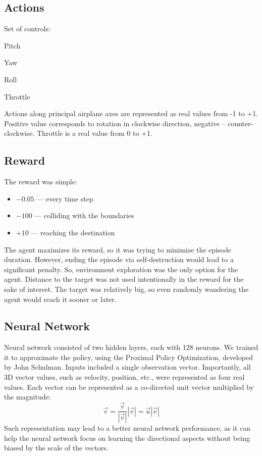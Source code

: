 \subsection{Actions}\label{subsec:pathfinder_actions}
Set of controls:
\begin{itemize}
	\begin{multicols}{2}
		\item Pitch
		\item Yaw
		\item Roll
		\item Throttle
	\end{multicols}
\end{itemize}
Actions along principal airplane axes are represented as real values from -1 to +1.
Positive value corresponds to rotation in clockwise direction, negative -- counter-clockwise.
Throttle is a real value from 0 to +1.

\subsection{Reward}\label{subsec:pathfinder_reward}
The reward was simple:
\begin{itemize}
	\item $-0.05$ — every time step
	\item $-100$ — colliding with the boundaries
	\item $+10$ — reaching the destination
\end{itemize}
The agent maximizes its reward, so it was trying to minimize the episode duration.
However, ending the episode via self-destruction would lead to a significant penalty.
So, environment exploration was the only option for the agent.
Distance to the target was not used intentionally in the reward for the sake of interest.
The target was relatively big, so even randomly wandering the agent would reach it sooner or later.

\subsection{Neural Network}\label{subsec:pathfinder_neural-network}
Neural network consisted of two hidden layers, each with 128 neurons.
We trained it to approximate the policy, using the Proximal Policy Optimization, developed by John Schulman.
Inputs included a single observation vector.
Importantly, all 3D vector values, such as velocity, position, etc., were represented as four real values.
Each vector can be represented as a co-directed unit vector multiplied by the magnitude:
\[
	\vec{v} = \frac{\vec{v}}{\left|\vec{v}\right|} \left|\vec{v}\right| = \vec{u} \left|\vec{v}\right|
\]
Such representation may lead to a better neural network performance,
as it can help the neural network focus
on learning the directional aspects without being biased by the scale of the vectors.


